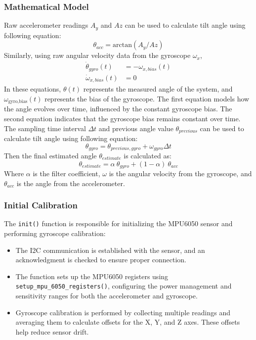 \subsubsection{Mathematical Model}
Raw accelerometer readings $A_y$ and $Az$ can be used to calculate tilt angle using following equation:
\begin{equation}
\theta_{acc} = \text{arctan} \left(A_y/Az  \right) \label{eq:eq}
\end{equation}
Similarly, using raw angular velocity data from the gyroscope $\omega_{x}$,
\begin{equation}
	\begin{aligned}
		\dot{\theta}_{gyro}(t) &= - \omega_{x,bias}(t) \\ \label{eq:state_eq_1}
		\dot{\omega}_{x,bias}(t) &= 0
	\end{aligned}
\end{equation}
In these equations, $\theta(t)$ represents the measured angle of the system, and $\omega_{\text{gyro,bias}}(t)$ represents the bias of the gyroscope. The first equation models how the angle evolves over time, influenced by the constant gyroscope bias. The second equation indicates that the gyroscope bias remains constant over time. The sampling time interval $\Delta t$ and previous angle value $\theta_{previous}$ can be used to calculate tilt angle using following equation:
\begin{equation}
\theta_{gyro} = \theta_{previous, gyro} + \omega_{gyro} \Delta t \label{eq:eq}
\end{equation}
Then the final estimated angle $\theta_{estimate}$ is calculated as:
\begin{equation}
	\theta_{estimate} = \alpha \ \theta_{gyro} + (1 - \alpha) \ \theta_{acc} \label{eq:eq}
\end{equation}
Where $\alpha$ is the filter coefficient, $\omega$ is the angular velocity from the gyroscope, and $\theta_{acc}$ is the angle from the accelerometer.

\subsubsection{Initial Calibration}
The \texttt{init()} function is responsible for initializing the MPU6050 sensor and performing gyroscope calibration:
\begin{itemize}
	\item The I2C communication is established with the sensor, and an acknowledgment is checked to ensure proper connection.
	\item The function sets up the MPU6050 registers using \texttt{setup\_mpu\_6050\_registers()}, configuring the power management and sensitivity ranges for both the accelerometer and gyroscope.
	\item Gyroscope calibration is performed by collecting multiple readings and averaging them to calculate offsets for the X, Y, and Z axes. These offsets help reduce sensor drift.
\end{itemize}

